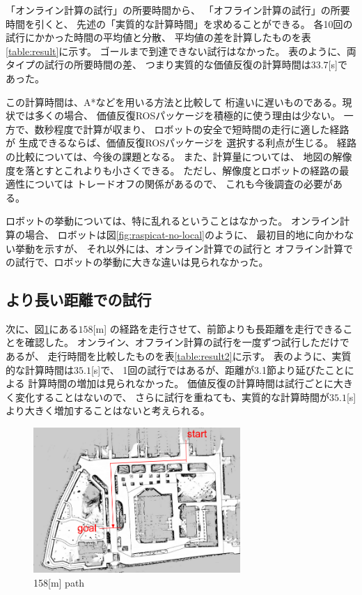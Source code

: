 \documentclass{jarticle}
\begin{document}
「オンライン計算の試行」の所要時間から、
「オフライン計算の試行」の所要時間を引くと、
先述の「実質的な計算時間」を求めることができる。
各10回の試行にかかった時間の平均値と分散、
平均値の差を計算したものを表\ref{table:result}に示す。
ゴールまで到達できない試行はなかった。
表のように、両タイプの試行の所要時間の差、
つまり実質的な価値反復の計算時間は$33.7$[s]であった。

この計算時間は、A*などを用いる方法と比較して
桁違いに遅いものである。現状では多くの場合、
価値反復ROSパッケージを積極的に使う理由は少ない。
一方で、数秒程度で計算が収まり、
ロボットの安全で短時間の走行に適した経路が
生成できるならば、価値反復ROSパッケージを
選択する利点が生じる。
経路の比較については、今後の課題となる。
また、計算量については、
地図の解像度を落とすとこれよりも小さくできる。
ただし、解像度とロボットの経路の最適性については
トレードオフの関係があるので、
これも今後調査の必要がある。

ロボットの挙動については、特に乱れるということはなかった。
オンライン計算の場合、
ロボットは図\ref{fig:raspicat-no-local}のように、
最初目的地に向かわない挙動を示すが、
それ以外には、オンライン計算での試行と
オフライン計算での試行で、ロボットの挙動に大きな違いは見られなかった。


\subsection{より長い距離での試行}

次に、図\ref{fig:tsudanuma-long-path}にある$158$[m]
の経路を走行させて、前節よりも長距離を走行できることを確認した。
オンライン、オフライン計算の試行を一度ずつ試行しただけであるが、
走行時間を比較したものを表\ref{table:result2}に示す。
表のように、実質的な計算時間は$35.1$[s]で、
1回の試行ではあるが、距離が3.1節より延びたことによる
計算時間の増加は見られなかった。
価値反復の計算時間は試行ごとに大きく変化することはないので、
さらに試行を重ねても、実質的な計算時間が$35.1$[s]
より大きく増加することはないと考えられる。

\begin{figure}[htb]
  \centering
   \includegraphics[height=55mm]{./figs/tsudanuma-long.png}
	\caption{158[m] path}
	\label{fig:tsudanuma-long-path}
\end{figure}
\end{document}
